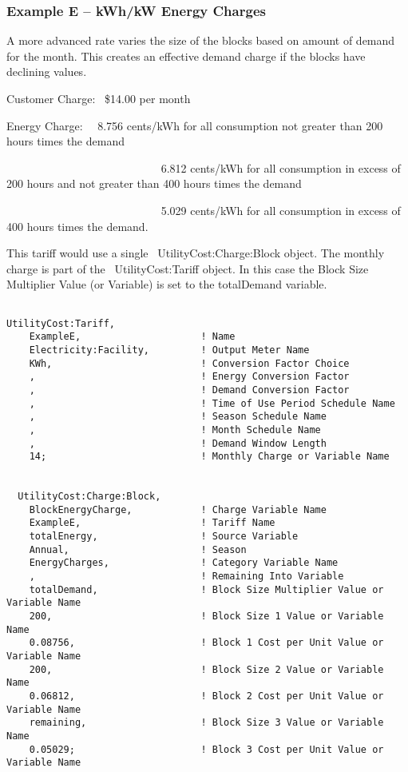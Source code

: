 \subsubsection{Example E -- kWh/kW Energy Charges}\label{example-e-kwhkw-energy-charges}

A more advanced rate varies the size of the blocks based on amount of demand for the month. This creates an effective demand charge if the blocks have declining values.

Customer Charge:~ \$14.00 per month

Energy Charge:~~ 8.756 cents/kWh for all consumption not greater than 200 hours times the demand

~~~~~~~~~~~~~~~~~~~~~~~~~~~ 6.812 cents/kWh for all consumption in excess of 200 hours and not greater than 400 hours times the demand

~~~~~~~~~~~~~~~~~~~~~~~~~~~ 5.029 cents/kWh for all consumption in excess of 400 hours times the demand.

This tariff would use a single ~UtilityCost:Charge:Block object. The monthly charge is part of the ~UtilityCost:Tariff object. In this case the Block Size Multiplier Value (or Variable) is set to the totalDemand variable.

\begin{lstlisting}

UtilityCost:Tariff,
    ExampleE,                     ! Name
    Electricity:Facility,         ! Output Meter Name
    KWh,                          ! Conversion Factor Choice
    ,                             ! Energy Conversion Factor
    ,                             ! Demand Conversion Factor
    ,                             ! Time of Use Period Schedule Name
    ,                             ! Season Schedule Name
    ,                             ! Month Schedule Name
    ,                             ! Demand Window Length
    14;                           ! Monthly Charge or Variable Name


  UtilityCost:Charge:Block,
    BlockEnergyCharge,            ! Charge Variable Name
    ExampleE,                     ! Tariff Name
    totalEnergy,                  ! Source Variable
    Annual,                       ! Season
    EnergyCharges,                ! Category Variable Name
    ,                             ! Remaining Into Variable
    totalDemand,                  ! Block Size Multiplier Value or Variable Name
    200,                          ! Block Size 1 Value or Variable Name
    0.08756,                      ! Block 1 Cost per Unit Value or Variable Name
    200,                          ! Block Size 2 Value or Variable Name
    0.06812,                      ! Block 2 Cost per Unit Value or Variable Name
    remaining,                    ! Block Size 3 Value or Variable Name
    0.05029;                      ! Block 3 Cost per Unit Value or Variable Name
\end{lstlisting}

